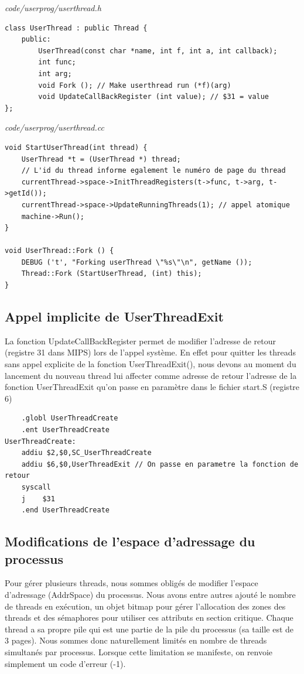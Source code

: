 \documentclass[a4paper,10pt]{article}
\begin{document}
\textit{code/userprog/userthread.h}
\begin{lstlisting}
class UserThread : public Thread {
    public:
        UserThread(const char *name, int f, int a, int callback);
        int func;
        int arg;
        void Fork (); // Make userthread run (*f)(arg)
        void UpdateCallBackRegister (int value); // $31 = value
};
\end{lstlisting}

\textit{code/userprog/userthread.cc}
\begin{lstlisting}
void StartUserThread(int thread) {
    UserThread *t = (UserThread *) thread;
    // L'id du thread informe egalement le numéro de page du thread
    currentThread->space->InitThreadRegisters(t->func, t->arg, t->getId());
    currentThread->space->UpdateRunningThreads(1); // appel atomique
    machine->Run();
}

void UserThread::Fork () {
    DEBUG ('t', "Forking userThread \"%s\"\n", getName ());
    Thread::Fork (StartUserThread, (int) this);
}
\end{lstlisting}

\subsection{Appel implicite de UserThreadExit}

La fonction UpdateCallBackRegister permet de modifier l'adresse de retour
(registre 31 dans MIPS) lors de l'appel système. En effet pour quitter les
threads sans appel explicite de la fonction UserThreadExit(), nous devons au
moment du lancement du nouveau thread lui affecter comme adresse de retour
l'adresse de la fonction UserThreadExit qu'on passe en paramètre dans
le fichier start.S (registre 6)

\begin{lstlisting}
    .globl UserThreadCreate
    .ent UserThreadCreate
UserThreadCreate:
    addiu $2,$0,SC_UserThreadCreate
    addiu $6,$0,UserThreadExit // On passe en parametre la fonction de retour
    syscall
    j    $31
    .end UserThreadCreate
\end{lstlisting}


\subsection{Modifications de l'espace d'adressage du processus}

Pour gérer plusieurs threads, nous sommes obligés de modifier l'espace
d'adressage (AddrSpace) du processus. Nous avons entre autres ajouté le nombre
de threads en exécution, un objet bitmap pour gérer l'allocation des
zones des threads et des sémaphores pour utiliser ces attributs en section
critique. Chaque thread a sa propre pile qui est une partie de la pile du
processus (sa taille est de 3 pages). Nous sommes donc naturellement limités en
nombre de threads simultanés par processus. Lorsque cette limitation
se manifeste, on renvoie simplement un code d'erreur (-1).
\end{document}
